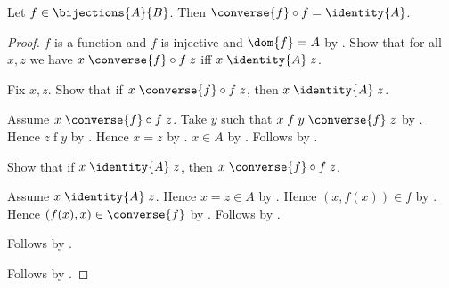 \begin{theorem}\label{bijection_converse_circ}
    Let $f\in\bijections{A}{B}$.
    Then $\converse{f}\circ f=\identity{A}$.
\end{theorem}
\begin{proof}
    $f$ is a function and $f$ is injective and $\dom{f}=A$ by
        .
    Show that for all $x,z$ we have
        $x\mathrel{\converse{f}\circ f}z$ iff
        $x\mathrel{\identity{A}}z$.
    \begin{subproof}
        Fix $x,z$.
        Show that if $x\mathrel{\converse{f}\circ f}z$, then
            $x\mathrel{\identity{A}}z$.
        \begin{subproof}
            Assume $x\mathrel{\converse{f}\circ f}z$.
            Take $y$ such that
                $x\mathrel{f}y\mathrel{\converse{f}}z$ by
                .
            Hence $z\mathrel{f}y$ by .
            Hence $x=z$ by .
            $x\in A$ by .
            Follows by .
        \end{subproof}
        Show that if $x\mathrel{\identity{A}}z$, then
            $x\mathrel{\converse{f}\circ f}z$.
        \begin{subproof}
            Assume $x\mathrel{\identity{A}}z$.
            Hence $x=z\in A$ by .
            Hence $(x,f(x))\in f$ by
                .
            Hence $(f(x),x)\in\converse{f}$ by
                .
            Follows by .
        \end{subproof}
        Follows by \auto.
    \end{subproof}
    Follows by
        .
\end{proof}

